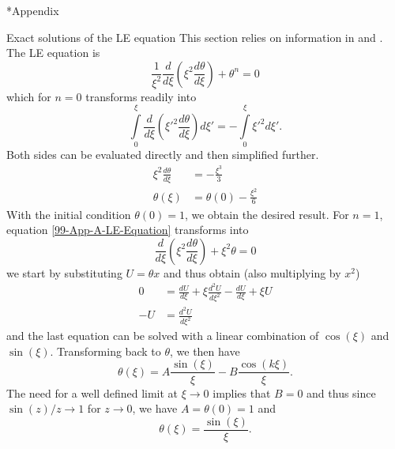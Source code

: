 \begin{appendix}
\renewcommand{\thesection}{\Alph{section}}
\renewcommand{\thesubsection}{\Alph{subsection}}

\begin{section}*{Appendix}
%
%
\begin{subsection}{Exact solutions of the LE equation}
\label{99-App-A-Exact-LE-Solutions}
This section relies on information in \cite{weissteinLaneEmdenDifferentialEquation} and \cite{chandrasekharChandrasekharAnIntroductionStudy1958}. The LE equation is
\begin{equation}
	\frac{1}{\xi^2}\frac{d}{d\xi}\left(\xi^2\frac{d\theta}{d\xi}\right)+\theta^n=0
	\label{99-App-A-LE-Equation}
\end{equation}
which for $n=0$ transforms readily into
\begin{equation}
	\int\limits_0^\xi\frac{d}{d\xi}\left(\xi'^2\frac{d\theta}{d\xi}\right)d\xi' = -\int\limits_0^\xi\xi'^2d\xi'.
\end{equation}
Both sides can be evaluated directly and then simplified further.
\begin{align}
	\xi^2\frac{d\theta}{d\xi} &= -\frac{\xi^3}{3}\\
	\theta(\xi) &= \theta(0)-\frac{\xi^2}{6}
\end{align}
With the initial condition $\theta(0)=1$, we obtain the desired result. For $n=1$, equation \ref{99-App-A-LE-Equation} transforms into
\begin{equation}
	\frac{d}{d\xi}\left(\xi^2\frac{d\theta}{d\xi}\right)+\xi^2\theta=0
\end{equation}
we start by substituting $U=\theta x$ and thus obtain (also multiplying by $x^2$)
\begin{align}
	0 &= \frac{dU}{d\xi} + \xi\frac{d^2U}{d\xi^2} - \frac{dU}{d\xi} + \xi U\\
	-U &= \frac{d^2U}{d\xi^2}
\end{align}
and the last equation can be solved with a linear combination of $\cos(\xi)$ and $\sin(\xi)$. Transforming back to $\theta$, we then have
\begin{equation}
	\theta(\xi) = A\frac{\sin(\xi)}{\xi} - B\frac{\cos(k\xi)}{\xi}.
\end{equation}
The need for a well defined limit at $\xi\rightarrow0$ implies that $B=0$ and thus since $\sin(z)/z\rightarrow1$ for $z\rightarrow0$, we have $A=\theta(0)=1$ and 
\begin{equation}
	\theta(\xi) = \frac{\sin(\xi)}{\xi}.

\end{equation}
\end{subsection}
\end{section}
\end{appendix}
